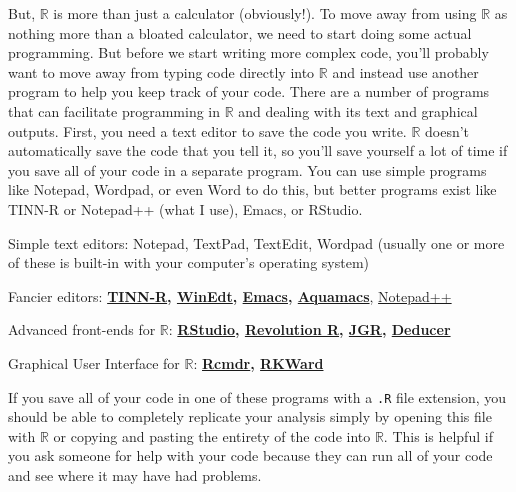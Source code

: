 \documentclass[12pt]{article}
\begin{document}
But, $\mathbb{R}$ is more than just a calculator (obviously!). To move away from using $\mathbb{R}$ as nothing more than a bloated calculator, we need to start doing some actual programming. But before we start writing more complex code, you'll probably want to move away from typing code directly into $\mathbb{R}$ and instead use another program to help you keep track of your code. There are a number of programs that can facilitate programming in $\mathbb{R}$ and dealing with its text and graphical outputs. First, you need a text editor to save the code you write. $\mathbb{R}$ doesn't automatically save the code that you tell it, so you'll save yourself a lot of time if you save all of your code in a separate program. You can use simple programs like Notepad, Wordpad, or even Word to do this, but better programs exist like TINN-R or Notepad++ (what I use), Emacs, or RStudio.%
\begin{itemize*}
\item Simple text editors: Notepad, TextPad, TextEdit, Wordpad (usually one or more of these is built-in with your computer's operating system)
\item Fancier editors: \textbf{\href{http://sciviews.org/Tinn-R/}{TINN-R}, \href{http://www.winedt.com/}{WinEdt}, \href{http://www.gnu.org/software/emacs/}{Emacs}, \href{http://aquamacs.org/}{Aquamacs}}, \href{http://notepad-plus-plus.org/}{Notepad++}
\item Advanced front-ends for $\mathbb{R}$: \textbf{\href{http://rstudio.org/}{RStudio}, \href{http://www.revolutionanalytics.com/products/revolution-enterprise.php}{Revolution R}, \href{http://rforge.net/JGR/}{JGR}, \href{http://www.deducer.org/pmwiki/pmwiki.php}{Deducer}}
\item Graphical User Interface for $\mathbb{R}$: \textbf{\href{http://socserv.mcmaster.ca/jfox/Misc/Rcmdr/}{Rcmdr}, \href{http://rkward.sourceforge.net/}{RKWard}}
\end{itemize*}

If you save all of your code in one of these programs with a \verb|.R| file extension, you should be able to completely replicate your analysis simply by opening this file with $\mathbb{R}$ or copying and pasting the entirety of the code into $\mathbb{R}$. This is helpful if you ask someone for help with your code because they can run all of your code and see where it may have had problems.
\end{document}

